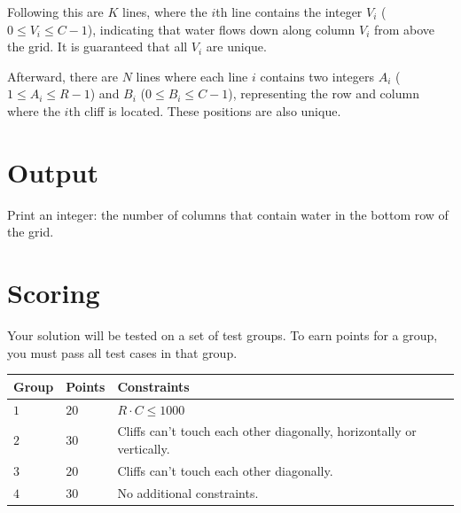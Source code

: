 Following this are $K$ lines, where the $i$th line contains the integer $V_i$ ($0 \le V_i \le C-1$), indicating that water flows
down along column $V_i$ from above the grid. It is guaranteed that all $V_i$ are unique.

Afterward, there are $N$ lines where each line $i$ contains two integers $A_i$ ($1 \le A_i \le R-1$) and
$B_i$ ($0 \le B_i \le C-1$), representing the row and column where the $i$th cliff is located.
These positions are also unique.

\section*{Output}
Print an integer: the number of columns that contain water in the bottom row of the grid.

\section*{Scoring}
Your solution will be tested on a set of test groups.
To earn points for a group, you must pass all test cases in that group.

\noindent
\begin{tabular}{| l | l | p{12cm} |}
  \hline
  \textbf{Group} & \textbf{Points} & \textbf{Constraints} \\ \hline
  $1$    & $20$      & $R \cdot C \le 1000$ \\ \hline
  $2$    & $30$      & Cliffs can't touch each other diagonally, horizontally or vertically. \\ \hline
  $3$    & $20$      & Cliffs can't touch each other diagonally. \\ \hline
  $4$    & $30$      & No additional constraints. \\ \hline
\end{tabular}

